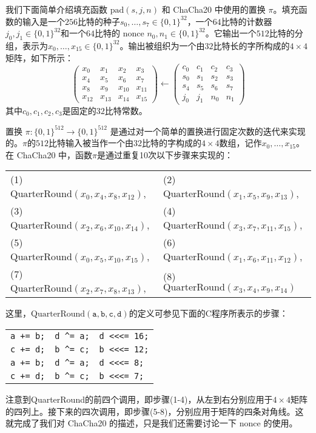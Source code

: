 \begin{snote}[实现细节。]
我们下面简单介绍填充函数 $\mathrm{pad}(s,j,n)$ 和 ChaCha20 中使用的置换 $\pi$。填充函数的输入是一个$256$比特的种子$s_0,\dots,s_7\in\{0,1\}^{32}$，一个$64$比特的计数器$j_0,j_1\in\{0,1\}^{32}$和一个$64$比特的 nonce $n_0,n_1\in\{0,1\}^{32}$。它输出一个$512$比特的分组，表示为$x_0,\dots,x_{15}\in\{0,1\}^{32}$。输出被组织为一个由$32$比特长的字所构成的$4\times4$矩阵，如下所示：
\begin{equation}
\begin{pmatrix}
x_0 & x_1 & x_2 & x_3 \\
x_4 & x_5 & x_6 & x_7 \\
x_8 & x_9 & x_{10} & x_{11} \\
x_{12} & x_{13} & x_{14} & x_{15}
\end{pmatrix}
\longleftarrow
\begin{pmatrix}
c_0 & c_1 & c_2 & c_3 \\
s_0 & s_1 & s_2 & s_3 \\
s_4 & s_5 & s_6 & s_7 \\
j_0 & j_1 & n_0 & n_1
\end{pmatrix}
\end{equation}
其中$c_0,c_1,c_2,c_3$是固定的$32$比特常数。

置换 $\pi:\{0,1\}^{512}\to\{0,1\}^{512}$ 是通过对一个简单的置换进行固定次数的迭代来实现的。$\pi$的$512$比特输入被当作一个由$32$比特的字构成的$4\times4$数组，记作$x_0,\dots,x_{15}$。在 ChaCha20 中，函数$\pi$是通过重复10次以下步骤来实现的：
\begin{center}
\begin{tabular}{ll}
 (1) $\mathrm{QuarterRound}(x_0,x_4,x_8,x_{12})$, & (2) $\mathrm{QuarterRound}(x_1,x_5,x_9,x_{13})$,\\ 
 (3) $\mathrm{QuarterRound}(x_2,x_6,x_{10},x_{14})$, & (4) $\mathrm{QuarterRound}(x_3,x_7,x_{11},x_{15})$,\\  
 (5) $\mathrm{QuarterRound}(x_0,x_5,x_{10},x_{15})$, & (6) $\mathrm{QuarterRound}(x_1,x_6,x_{11},x_{12})$,\\
 (7) $\mathrm{QuarterRound}(x_2,x_7,x_8,x_{13})$, & (8) $\mathrm{QuarterRound}(x_3,x_4,x_9,x_{14})$\\
\end{tabular}
\end{center}
这里，$\mathrm{QuarterRound}(\texttt{a},\texttt{b},\texttt{c},\texttt{d})$的定义可参见下面的C程序所表示的步骤：
\begin{center}
\begin{tabular}{lll}
\texttt{a += b;} & \texttt{d \^{}=  a;} & \texttt{d <<<= 16;}\\
\texttt{c += d;} & \texttt{b \^{}=  c;} & \texttt{b <<<= 12;}\\
\texttt{a += b;} & \texttt{d \^{}=  a;} & \texttt{d <<<= 8;}\\
\texttt{c += d;} & \texttt{b \^{}=  c;} & \texttt{b <<<= 7;}
\end{tabular}
\end{center}
注意到QuarterRound的前四个调用，即步骤(1-4)，从左到右分别应用于$4\times4$矩阵的四列上。接下来的四次调用，即步骤(5-8)，分别应用于矩阵的四条对角线。这就完成了我们对 ChaCha20 的描述，只是我们还需要讨论一下 nonce 的使用。
\end{snote}

